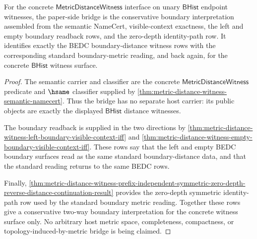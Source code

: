 \begin{theorem}
\label{thm:metric-distance-witness-standard-boundary-bridge}
For the concrete $\mathsf{MetricDistanceWitness}$ interface on unary
$\mathsf{BHist}$ endpoint witnesses, the paper-side bridge is the conservative
boundary interpretation assembled from the semantic NameCert, visible-context
exactness, the left and empty boundary readback rows, and the zero-depth
identity-path row. It identifies exactly the BEDC boundary-distance witness rows
with the corresponding standard boundary-metric reading, and back again, for the
concrete $\mathsf{BHist}$ witness surface.
\end{theorem}
\begin{proof}
The semantic carrier and classifier are the concrete
$\mathsf{MetricDistanceWitness}$ predicate and $\hsame$ classifier supplied by
\autoref{thm:metric-distance-witness-semantic-namecert}. Thus the bridge has no
separate host carrier: its public objects are exactly the displayed
$\mathsf{BHist}$ distance witnesses.

The boundary readback is supplied in the two directions by
\autoref{thm:metric-distance-witness-left-boundary-visible-context-iff} and
\autoref{thm:metric-distance-witness-empty-boundary-visible-context-iff}. These
rows say that the left and empty BEDC boundary surfaces read as the same
standard boundary-distance data, and that the standard reading returns to the
same BEDC rows.

Finally,
\autoref{thm:metric-distance-witness-prefix-independent-symmetric-zero-depth-reverse-distance-continuation-result}
provides the zero-depth symmetric identity-path row used by the standard
boundary metric reading. Together these rows give a conservative two-way
boundary interpretation for the concrete witness surface only. No arbitrary
host metric space, completeness, compactness, or topology-induced-by-metric
bridge is being claimed.
\end{proof}

